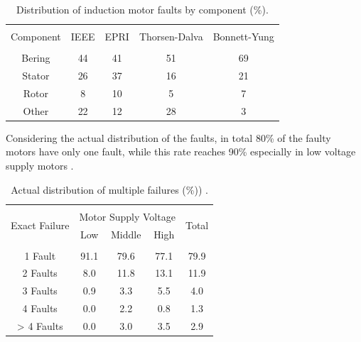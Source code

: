 \begin{table}[h]
	{\setlength{\tabcolsep}{12pt}
		\caption{Distribution of induction motor faults by component (\%).}
		\begin{center}
			\vspace{-6mm}
			\begin{tabular}{ccccc}
				\hline \\[-2.45ex] \hline \\[-2.1ex]
				Component & IEEE & EPRI & Thorsen-Dalva & Bonnett-Yung \\
				\hline \\[-1.8ex]
				Bering & 44 & 41 & 51 & 69 \\
				Stator & 26 & 37  & 16 & 21\\
				Rotor & 8 & 10 & 5 & 7 \\
				Other & 22 & 12  & 28 & 3\\
				\hline
			\end{tabular}
			\vspace{-6mm}
		\end{center}
		\label{Table2.1}}
\end{table}

Considering the actual distribution of the faults, in total 80\% of the faulty motors have only one fault, while this rate reaches 90\% especially in low voltage supply motors \cite{albrecht1987assessment}.

\begin{table}[h]
	{\setlength{\tabcolsep}{12pt}
		\caption{Actual distribution of multiple failures (\%)) \cite{albrecht1987assessment}.}
		\begin{center}
			\vspace{-6mm}
			\begin{tabular}{ccccc}
				\hline \\[-2.45ex] \hline \\[-2.1ex]
				\multirow{2}{*}{Exact Failure} & \multicolumn{3}{c}{Motor Supply Voltage} & \multirow{2}{*}{Total} \\
				& Low  & Middle & High &      \\
				\hline \\[-1.8ex]
				1 Fault   & 91.1 & 79.6   & 77.1 & 79.9 \\
				2 Faults  & 8.0  & 11.8   & 13.1 & 11.9 \\
				3 Faults  & 0.9  & 3.3    & 5.5  & 4.0  \\
				4 Faults  & 0.0  & 2.2    & 0.8  & 1.3  \\
				> 4 Faults & 0.0  & 3.0    & 3.5  & 2.9  \\
				\hline
			\end{tabular}
			\vspace{-6mm}
		\end{center}
		\label{Table2.2}}
\end{table}

